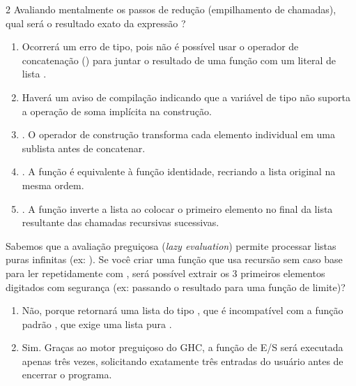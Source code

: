 \documentclass[a4paper,10pt,brazil]{article}
\begin{document}
\begin{multicols}{2}
Avaliando mentalmente os passos de redução (empilhamento de chamadas), qual será o resultado exato da expressão ?

\begin{enumerate}
  \item Ocorrerá um erro de tipo, pois não é possível usar o operador de concatenação (\haskellinline{++}) para juntar o resultado de uma função com um literal de lista \haskellinline{[x]}.

  \item Haverá um aviso de compilação indicando que a variável de tipo  não suporta a operação de soma implícita na construção.

  \item \haskellinline{[[1], [2], [3]]}. O operador de construção transforma cada elemento individual em uma sublista antes de concatenar.

  \item \haskellinline{[1, 2, 3]}. A função é equivalente à função identidade, recriando a lista original na mesma ordem.

  \item \haskellinline{[3, 2, 1]}. A função inverte a lista ao colocar o primeiro elemento no final da lista resultante das chamadas recursivas sucessivas.


\end{enumerate}

Sabemos que a avaliação preguiçosa (\emph{lazy evaluation}) permite processar listas puras infinitas (ex: ). 
Se você criar uma função  que usa recursão sem caso base para ler repetidamente com , será possível extrair os 3 primeiros elementos digitados com segurança (ex: passando o resultado para uma função de limite)?

\begin{enumerate}
  \item Não, porque  retornará uma lista do tipo \haskellinline{[IO String]}, que é incompatível com a função padrão , que exige uma lista pura \haskellinline{[a]}.

  \item Sim. Graças ao motor preguiçoso do GHC, a função de E/S será executada apenas três vezes, solicitando exatamente três entradas do usuário antes de encerrar o programa.


\end{enumerate}
\end{multicols}
\end{document}
